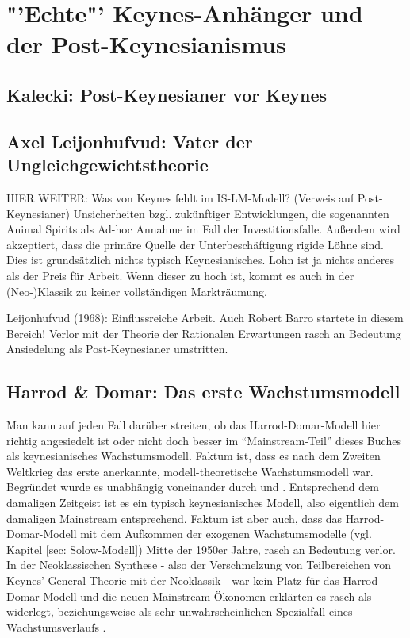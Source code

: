 %
%
%

\chapter{"'Echte"' Keynes-Anhänger und der Post-Keynesianismus}
\label{Post-Keynes}


\section{Kalecki: Post-Keynesianer vor Keynes}



\section{Axel Leijonhufvud: Vater der Ungleichgewichtstheorie}

HIER WEITER: \parencite{Patinkin1990}
Was von Keynes fehlt im IS-LM-Modell? (Verweis auf Post-Keynesianer) Unsicherheiten bzgl. zukünftiger Entwicklungen, die sogenannten Animal Spirits als Ad-hoc Annahme im Fall der Investitionsfalle. Außerdem wird akzeptiert, dass die primäre Quelle der Unterbeschäftigung rigide Löhne sind. Dies ist grundsätzlich nichts typisch Keynesianisches. Lohn ist ja nichts anderes als der Preis für Arbeit. Wenn dieser zu hoch ist, kommt es auch in der (Neo-)Klassik zu keiner vollständigen Markträumung.


Leijonhufvud (1968): Einflussreiche Arbeit. Auch Robert Barro startete in diesem Bereich!
Verlor mit der Theorie der Rationalen Erwartungen rasch an Bedeutung
Ansiedelung als Post-Keynesianer umstritten.



\section{Harrod \& Domar: Das erste Wachstumsmodell}
\label{Harrod}
Man kann auf jeden Fall darüber streiten, ob das Harrod-Domar-Modell hier richtig angesiedelt ist oder nicht doch besser im "`Mainstream-Teil"' dieses Buches als keynesianisches Wachstumsmodell. Faktum ist, dass es nach dem Zweiten Weltkrieg das erste anerkannte, modell-theoretische Wachstumsmodell war. Begründet wurde es unabhängig voneinander durch \textcite{Harrod1939} und \textcite{Domar1946, Domar1947}. Entsprechend dem damaligen Zeitgeist ist es ein typisch keynesianisches Modell, also eigentlich dem damaligen Mainstream entsprechend. Faktum ist aber auch, dass das Harrod-Domar-Modell mit dem Aufkommen der exogenen Wachstumsmodelle (vgl. Kapitel \ref{sec: Solow-Modell}) Mitte der 1950er Jahre, rasch an Bedeutung verlor. In der Neoklassischen Synthese - also der Verschmelzung von Teilbereichen von Keynes' General Theorie mit der Neoklassik - war kein Platz für das Harrod-Domar-Modell und die neuen Mainstream-Ökonomen erklärten es rasch als widerlegt, beziehungsweise als sehr unwahrscheinlichen Spezialfall eines Wachstumsverlaufs \parencite{Solow1987}. 

